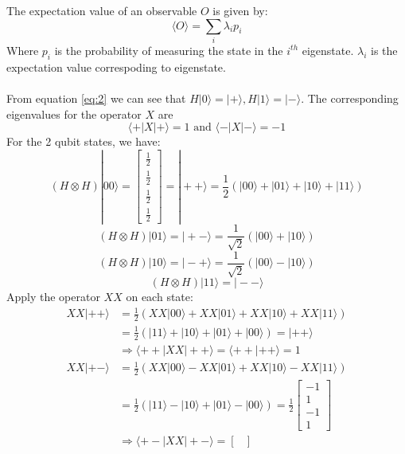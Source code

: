 \documentclass{article}
\begin{document}
\begin{itemize}
	      The expectation value of an observable \(O\) is given by:
	      \begin{equation*}
		      \langle O \rangle = \sum_{i} \lambda_i p_i
	      \end{equation*}
	      Where \(p_i\) is the probability of measuring the state in the \(i^{th}\) eigenstate. $\lambda_i$ is the expectation value correspoding to eigenstate.\\ \\
	      From equation \eqref{eq:2} we can see that \(H |0 \rangle = | + \rangle, H|1\rangle = | - \rangle\). The corresponding eigenvalues for the operator \(X\) are
	      \[\langle + | X |+ \rangle = 1 \text{ and } \langle - | X | - \rangle = -1\]
	      For the 2 qubit states, we have:
	      \[(H \otimes H)|00\rangle = \begin{bmatrix}
			      \frac{1}{2} \\
			      \frac{1}{2} \\
			      \frac{1}{2} \\
			      \frac{1}{2}
		      \end{bmatrix} = |++\rangle = \frac{1}{2}(|00\rangle + |01\rangle + |10\rangle + |11\rangle)\]
	      \[(H \otimes H)|01\rangle =|+-\rangle = \frac{1}{\sqrt{2}} (|00\rangle + |10\rangle)\]
	      \[(H \otimes H)|10\rangle =|-+\rangle = \frac{1}{\sqrt{2}} (|00\rangle - |10\rangle)\]
	      \[(H \otimes H)|11\rangle =|--\rangle\]
	      Apply the operator \(XX\) on each state:
	      \begin{align*}
		      XX|++\rangle & = \frac{1}{2}(XX|00\rangle + XX|01\rangle + XX|10\rangle + XX|11\rangle)      \\
		                   & = \frac{1}{2}(|11\rangle + |10\rangle + |01\rangle + |00\rangle) = |++\rangle \\
		                   & \Rightarrow \langle++ |XX|++ \rangle = \langle++ |++ \rangle =1 \\
			  XX|+-\rangle & = \frac{1}{2}(XX|00\rangle - XX|01\rangle + XX|10\rangle - XX|11\rangle)      \\
			  &= \frac{1}{2}(|11\rangle - |10\rangle + |01\rangle - |00\rangle) = \frac{1}{2} \begin{bmatrix}
				-1 \\
				1  \\
				-1 \\
				1
			  \end{bmatrix}\\
			  & \Rightarrow \langle+- |XX|+- \rangle = \begin{bmatrix}

\end{bmatrix}
\end{align*}
\end{itemize}
\end{document}
